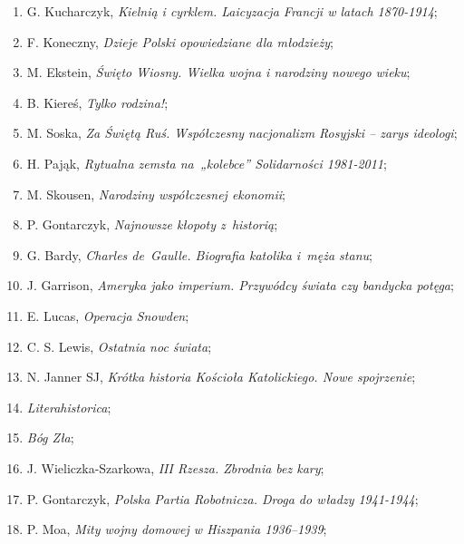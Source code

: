 \documentclass[a4paper,11pt]{article}
\begin{document}
\begin{enumerate}
\item G. Kucharczyk, \textit{Kielnią i cyrklem. Laicyzacja Francji w
    latach 1870-1914};

\item F. Koneczny, \textit{Dzieje Polski opowiedziane dla młodzieży};

\item M. Ekstein, \textit{Święto Wiosny. Wielka wojna i narodziny nowego
    wieku};

\item B. Kiereś, \textit{Tylko rodzina!};

\item M. Soska, \textit{Za Świętą Ruś. Współczesny nacjonalizm Rosyjski
    -- zarys ideologi};

\item H. Pająk, \textit{Rytualna zemsta na~„kolebce” Solidarności
    1981-2011};

\item M. Skousen, \textit{Narodziny współczesnej ekonomii};


\item P. Gontarczyk, \textit{Najnowsze kłopoty z~historią};


\item G. Bardy, \textit{Charles de~Gaulle. Biografia katolika i~męża
    stanu};

\item J. Garrison, \textit{Ameryka jako imperium. Przywódcy świata czy
    bandycka potęga};

\item E. Lucas, \textit{Operacja Snowden};

\item C. S. Lewis, \textit{Ostatnia noc świata};

\item N. Janner SJ, \textit{Krótka historia Kościoła Katolickiego. Nowe
    spojrzenie};

\item \textit{Literahistorica};

\item \textit{Bóg Zła};

\item J. Wieliczka-Szarkowa, \textit{III Rzesza. Zbrodnia bez kary};

\item P. Gontarczyk, \textit{Polska Partia Robotnicza. Droga do władzy
    1941-1944};

\item P. Moa, \textit{Mity wojny domowej w Hiszpania 1936--1939};


\end{enumerate}
\end{document}
